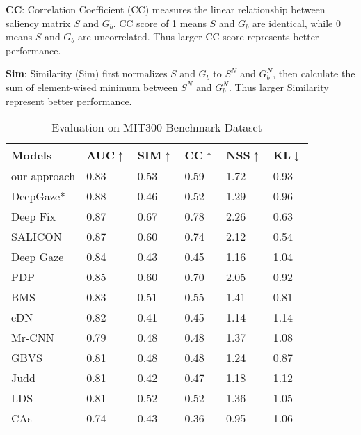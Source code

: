 \documentclass[letterpaper, 10 pt, conference]{ieeeconf}  %
\begin{document}
\par \textbf{CC}: Correlation Coefficient (CC) measures the linear relationship between saliency matrix $S$ and $G_{b}$. CC score of 1 means $S$ and $G_{b}$ are identical, while 0 means $S$ and $G_{b}$ are uncorrelated. Thus larger CC score represents better performance.

\par \textbf{Sim}: Similarity (Sim) first normalizes $S$ and $G_{b}$ to $S^{N}$ and $G^{N}_{b}$, then calculate the sum of element-wised minimum between $S^{N}$ and $G^{N}_{b}$. Thus larger Similarity represent better performance.

\begin{table}
\caption{Evaluation on MIT300 Benchmark Dataset}
\label{table}
\begin{tabular}{|p{50pt}|p{30pt}|p{30pt}|p{20pt}|p{30pt}|p{30pt}|}
\hline
Models & AUC$\uparrow$ & SIM$\uparrow$ & CC$\uparrow$ & NSS$\uparrow$ & KL$\downarrow$ \\
\hline
our approach & 0.83 & 0.53 & 0.59 & 1.72 & 0.93 \\
DeepGaze*\cite{b18} & 0.88 & 0.46 & 0.52 & 1.29 & 0.96 \\
Deep Fix\cite{b6} & 0.87 & 0.67 & 0.78 & 2.26 & 0.63 \\
SALICON\cite{b7} & 0.87 & 0.60 & 0.74 & 2.12 & 0.54 \\
Deep Gaze\cite{b18}  & 0.84 & 0.43 & 0.45 & 1.16 & 1.04 \\
PDP\cite{b21} & 0.85 & 0.60 & 0.70 & 2.05 & 0.92 \\
BMS\cite{b37} & 0.83 & 0.51 & 0.55 & 1.41 & 0.81 \\
eDN\cite{b15} & 0.82 & 0.41 & 0.45 & 1.14 & 1.14 \\
Mr-CNN\cite{b38} & 0.79 & 0.48 & 0.48 & 1.37 & 1.08 \\
GBVS\cite{b39} & 0.81 & 0.48 & 0.48 & 1.24 & 0.87 \\
Judd\cite{b23} & 0.81 & 0.42 & 0.47 & 1.18 & 1.12 \\
LDS\cite{b40} & 0.81 & 0.52 & 0.52 & 1.36 & 1.05 \\
CAs\cite{b41} & 0.74 & 0.43 & 0.36 & 0.95 & 1.06 \\
\hline
\end{tabular}
\label{tab2}
\end{table}
\end{document}
